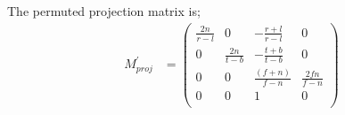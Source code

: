 The permuted projection matrix is; 
\begin{equation}
\begin{aligned}
M^{\prime}_{proj} &= 
\begin{pmatrix} 
\frac{2n}{r-l} & 0 & -\frac{r+l}{r-l} & 0 \\
0 & \frac{2n}{t-b} & -\frac{t+b}{t-b} & 0 \\
0 & 0 & \frac{(f+n)}{f-n} & \frac{2fn}{f-n} \\
0 & 0 & 1 & 0 \\
\end{pmatrix} \\
\end{aligned}
\end{equation}

